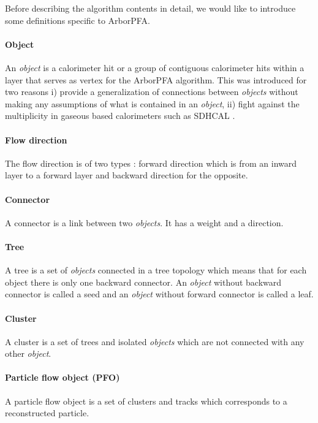 \documentclass[cits]{JINST}
\begin{document}
Before describing the algorithm contents in detail, we would like to introduce some definitions specific to ArborPFA.

\paragraph*{Object} An \textit{object} is a calorimeter hit or a group of contiguous calorimeter hits within a layer that serves as vertex for the ArborPFA algorithm. This was introduced for two reasons i) provide a generalization of connections between \textit{objects} without making any assumptions of what is contained in an \textit{object}, ii) fight against the multiplicity in gaseous based calorimeters such as SDHCAL \cite{sdhcal-paper}.

\paragraph*{Flow direction} The flow direction is of two types : forward direction which is from an inward layer to a forward layer and backward direction for the opposite.

\paragraph*{Connector} A connector is a link between two \textit{objects}. It has a weight and a direction.

\paragraph*{Tree} A tree is a set of \textit{objects} connected in a tree topology which means that for each object there is only one backward connector. An \textit{object} without backward connector is called a seed and an \textit{object} without forward connector is called a leaf.

\paragraph*{Cluster} A cluster is a set of trees and isolated \textit{objects} which are not connected with any other \textit{object}.

\paragraph*{Particle flow object (PFO)} A particle flow object is a set of clusters and tracks which corresponds to a reconstructed particle.
\end{document}
